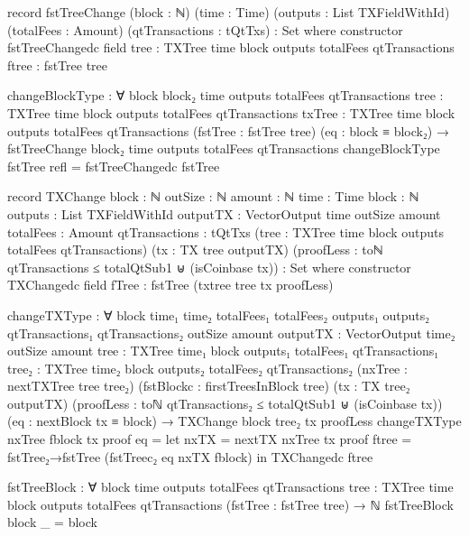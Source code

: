 \documentclass{beamer}
\begin{document}
\begin{code}
      record fstTreeChange
        (block : ℕ)
        (time : Time)
        (outputs : List TXFieldWithId)
        (totalFees : Amount)
        (qtTransactions : tQtTxs)
        : Set where
        constructor fstTreeChangedc
        field
          {tree}      : TXTree time block outputs totalFees qtTransactions
          ftree       : fstTree tree

      changeBlockType : ∀
        {block block₂ time outputs totalFees qtTransactions}
        {tree : TXTree time block outputs totalFees qtTransactions}
        {txTree : TXTree time block outputs totalFees qtTransactions}
        (fstTree : fstTree tree)
        (eq : block ≡ block₂)
        → fstTreeChange block₂ time outputs totalFees qtTransactions
      changeBlockType fstTree refl = fstTreeChangedc fstTree

      record TXChange
        {block : ℕ}
        {outSize : ℕ}
        {amount : ℕ}
        {time : Time}
        {block : ℕ}
        {outputs : List TXFieldWithId}
        {outputTX : VectorOutput time outSize amount}
        {totalFees : Amount}
        {qtTransactions : tQtTxs}
        (tree : TXTree time block outputs totalFees qtTransactions)
        (tx : TX tree outputTX)
        (proofLess :
          toℕ qtTransactions ≤ totalQtSub1
          ⊎
          (isCoinbase tx))
        : Set where
        constructor TXChangedc
        field
          fTree                 : fstTree (txtree tree tx proofLess)


      changeTXType : ∀
        {block time₁ time₂ totalFees₁ totalFees₂ outputs₁ outputs₂ qtTransactions₁ qtTransactions₂
        outSize amount}
        {outputTX : VectorOutput time₂ outSize amount}
        {tree : TXTree time₁ block outputs₁ totalFees₁ qtTransactions₁}
        {tree₂ : TXTree time₂ block outputs₂ totalFees₂ qtTransactions₂}
        (nxTree : nextTXTree tree tree₂)
        (fstBlockc : firstTreesInBlock tree)
        (tx : TX tree₂ outputTX)
        (proofLess :
          toℕ qtTransactions₂ ≤ totalQtSub1
          ⊎
          (isCoinbase tx))
        (eq : nextBlock tx ≡ block)
        → TXChange {block} tree₂ tx proofLess
      changeTXType nxTree fblock tx proof eq =
        let nxTX = nextTX nxTree tx proof
            ftree = fstTree₂→fstTree (fstTreec₂ eq nxTX fblock)
        in TXChangedc ftree


      fstTreeBlock : ∀
        {block time outputs totalFees qtTransactions}
        {tree : TXTree time block outputs totalFees qtTransactions}
        (fstTree : fstTree tree)
        → ℕ
      fstTreeBlock {block} _ = block


\end{code}
\end{document}
